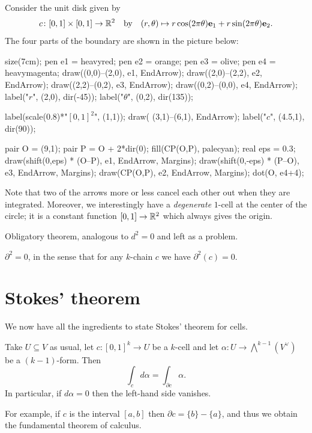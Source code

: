 \begin{example}
	Consider the unit disk given by
	\[ c \colon [0,1] \times [0,1] \to \mathbb R^2 \quad\text{by}\quad
	(r,\theta) \mapsto r\cos(2\pi \theta)\mathbf e_1 + r\sin(2\pi \theta)\mathbf e_2. \]
	The four parts of the boundary are shown in the picture below:
	\begin{center}
		\begin{asy}
			size(7cm);
			pen e1 = heavyred;
			pen e2 = orange;
			pen e3 = olive;
			pen e4 = heavymagenta;
			draw((0,0)--(2,0), e1, EndArrow);
			draw((2,0)--(2,2), e2, EndArrow);
			draw((2,2)--(0,2), e3, EndArrow);
			draw((0,2)--(0,0), e4, EndArrow);
			label("$r$", (2,0), dir(-45));
			label("$\theta$", (0,2), dir(135));

			label(scale(0.8)*"$[0,1]^2$", (1,1));
			draw( (3,1)--(6,1), EndArrow);
			label("$c$", (4.5,1), dir(90));

			pair O = (9,1);
			pair P = O + 2*dir(0);
			fill(CP(O,P), palecyan);
			real eps = 0.3;
			draw(shift(0,eps) * (O--P), e1, EndArrow, Margins);
			draw(shift(0,-eps) * (P--O), e3, EndArrow, Margins);
			draw(CP(O,P), e2, EndArrow, Margins);
			dot(O, e4+4);
		\end{asy}
	\end{center}
	Note that two of the arrows more or less cancel each other out when they are integrated.
	Moreover, we interestingly have a \emph{degenerate} $1$-cell at the center of the circle;
	it is a constant function $[0,1] \to \mathbb R^2$ which always gives the origin.
\end{example}

Obligatory theorem, analogous to $d^2=0$ and left as a problem.
\begin{theorem}
	$\partial^2 = 0$, in the sense that for any $k$-chain $c$ we have $\partial^2(c) = 0$.
\end{theorem}

\section{Stokes' theorem}

We now have all the ingredients to state Stokes' theorem for cells.
\begin{theorem}
	Take $U \subseteq V$ as usual, let $c \colon [0,1]^k \to U$ be a $k$-cell
	and let $\alpha \colon U \to \bigwedge^{k-1}(V^\vee)$ be a $(k-1)$-form.
	Then
	\[ \int_c d\alpha = \int_{\partial c} \alpha. \]
	In particular, if $d\alpha = 0$ then the left-hand side vanishes.
\end{theorem}
For example, if $c$ is the interval $[a,b]$ then $\partial c = \{b\} - \{a\}$,
and thus we obtain the fundamental theorem of calculus.


